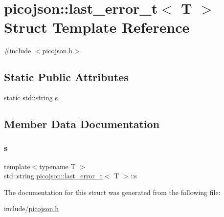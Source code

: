 \hypertarget{structpicojson_1_1last__error__t}{}\section{picojson\+:\+:last\+\_\+error\+\_\+t$<$ T $>$ Struct Template Reference}
\label{structpicojson_1_1last__error__t}


{\ttfamily \#include $<$picojson.\+h$>$}

\subsection*{Static Public Attributes}
\begin{DoxyCompactItemize}
\item 
static std\+::string \hyperlink{structpicojson_1_1last__error__t_a270361f4321424bfd800c36607bf0411}{s}
\end{DoxyCompactItemize}


\subsection{Member Data Documentation}
\hypertarget{structpicojson_1_1last__error__t_a270361f4321424bfd800c36607bf0411}{}\label{structpicojson_1_1last__error__t_a270361f4321424bfd800c36607bf0411} 
\subsubsection{\texorpdfstring{s}{s}}
{\footnotesize\ttfamily template$<$typename T $>$ \\
std\+::string \hyperlink{structpicojson_1_1last__error__t}{picojson\+::last\+\_\+error\+\_\+t}$<$ T $>$\+::s\hspace{0.3cm}{\ttfamily [static]}}



The documentation for this struct was generated from the following file\+:\begin{DoxyCompactItemize}
\item 
include/\hyperlink{picojson_8h}{picojson.\+h}\end{DoxyCompactItemize}
